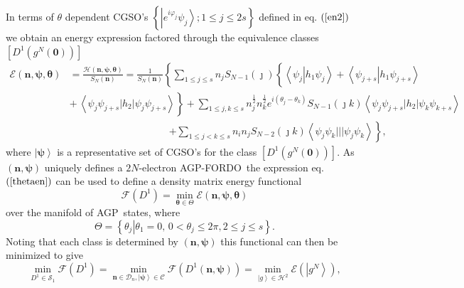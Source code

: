 \documentclass[aps,preprint]{revtex4}%
\begin{document}
In terms of $\theta$ dependent CGSO's $\left\{  \left\vert e^{i\varphi_{j}%
}\psi_{j}\right\rangle ;1\leq j\leq2s\right\}  $ defined in eq. $\left(
\ref{en2}\right)  $ we obtain an energy expression factored through the
equivalence classes $\left[  D^{1}\left(  g^{N}\left(  \mathbf{0}\right)
\right)  \right]  $
\begin{align}
\mathcal{E}\left(  \mathbf{n},\mathbf{\psi},\mathbf{\theta}\right)   &
=\frac{\mathcal{H}\left(  \mathbf{n},\mathbf{\psi},\mathbf{\theta}\right)
}{S_{N}\left(  \mathbf{n}\right)  }=\frac{1}{S_{N}\left(  \mathbf{n}\right)
}\left\{  \sum_{1\leq j\leq s}n_{j}S_{N-1}\left(  \jmath\right)  \left\{
\overset{}{\left\langle \psi_{j}\left\vert h_{1}\psi_{j}\right.  \right\rangle
+\left\langle \psi_{j+s}\left\vert h_{1}\psi_{j+s}\right.  \right\rangle
}\right.  \right.  \nonumber\\
&  \left.  +\overset{}{\,\left\langle \psi_{j}\psi_{j+s}|h_{2}|\psi_{j}%
\psi_{j+s}\right\rangle }\right\}  +\sum_{1\leq j,k\leq s}n_{j}^{\frac{1}{2}%
}n_{k}^{\frac{1}{2}}e^{i\left(  \theta_{j}-\theta_{k}\right)  }S_{N-1}\left(
\jmath k\right)  \left\langle \psi_{j}\psi_{j+s}|h_{2}|\psi_{k}\psi
_{k+s}\right\rangle \nonumber\\
&  \qquad\qquad\qquad\qquad\qquad\left.  +\sum_{1\leq j<k\leq s}n_{i}%
n_{j}S_{N-2}\left(  \jmath k\right)  \left\langle \psi_{j}\psi_{k}|||\psi
_{j}\psi_{k}\right\rangle \right\}  ,\label{thetaen}%
\end{align}
where $\left\vert \mathbf{\psi}\right\rangle $ is a representative set of
CGSO's for the class $\left[  D^{1}\left(  g^{N}\left(  \mathbf{0}\right)
\right)  \right]  $. As $\left(  \mathbf{n},\mathbf{\psi}\right)  $ uniquely
defines a $2N$-electron AGP-FORDO\ the expression eq. $\left(  \ref{thetaen}%
\right)  $ can be used to define a density matrix energy functional
\begin{equation}
\mathcal{F}\left(  D^{1}\right)  =\min_{\mathbf{\theta\in}\Theta}%
\mathcal{E}\left(  \mathbf{n},\mathbf{\psi},\mathbf{\theta}\right)
\end{equation}
over the manifold of AGP\ states, where
\begin{equation}
\Theta=\left\{  \left.  \theta_{j}\right\vert \theta_{1}=0,\,0<\theta_{j}%
\leq2\pi,2\leq j\leq s\right\}  .
\end{equation}
Noting that each class is determined by $\left(  \mathbf{n},\mathbf{\psi
}\right)  $ this functional can then be minimized to give
\begin{equation}
\min_{D^{1}\in\mathcal{S}_{1}}\mathcal{F}\left(  D^{1}\right)  =\min
_{\mathbf{n\in}\mathcal{D}_{n},\left\vert \mathbf{\psi}\right\rangle
\in\mathcal{C}}\mathcal{F}\left(  D^{1}\left(  \mathbf{n},\mathbf{\psi
}\right)  \right)  =\min_{\left\vert g\right\rangle \in\mathcal{H}^{2}%
}\mathcal{E}\left(  \left\vert g^{N}\right\rangle \right)  ,\label{MinDMF}%
\end{equation}
\end{document}
